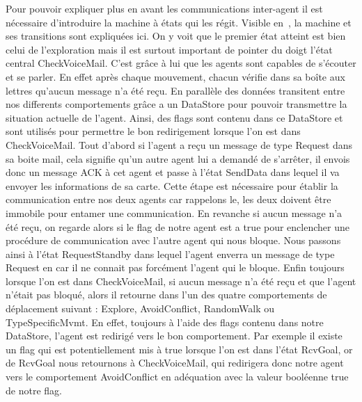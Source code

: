 \documentclass[11pt]{article}
\begin{document}
Pour pouvoir expliquer plus en avant les communications inter-agent il est nécessaire d'introduire la machine à états qui les régit. Visible en~, la machine et ses transitions sont expliquées ici. On y voit que le premier état atteint est bien celui de l'exploration mais il est surtout important de pointer du doigt l'état central \textsf{CheckVoiceMail}. C'est grâce à lui que les agents sont capables de s'écouter et se parler. En effet après chaque mouvement, chacun vérifie dans sa boîte aux lettres qu'aucun message n'a été reçu. En parallèle des données transitent entre nos differents comportements grâce a un DataStore pour pouvoir transmettre la situation actuelle de l'agent. Ainsi, des flags sont contenu dans ce DataStore et sont utilisés pour permettre le bon redirigement lorsque l'on est dans \textsf{CheckVoiceMail}. Tout d'abord si l'agent a reçu un message de type Request dans sa boite mail, cela signifie qu'un autre agent lui a demandé de s'arrêter, il envois donc un message ACK à cet agent et passe à l'état \textsf{SendData} dans lequel il va envoyer les informations de sa carte. Cette étape est nécessaire pour établir la communication entre nos deux agents car rappelons le, les deux doivent être immobile pour entamer une communication. En revanche si aucun message n'a été reçu, on regarde alors si le flag  de notre agent est a true pour enclencher une procédure de communication avec l'autre agent qui nous bloque. Nous passons ainsi à l'état \textsf{RequestStandby} dans lequel l'agent enverra un message de type Request en  car il ne connait pas forcément l'agent qui le bloque. Enfin toujours lorsque l'on est dans \textsf{CheckVoiceMail}, si aucun message n'a été reçu et que l'agent n'était pas bloqué, alors il retourne dans l'un  des quatre comportements de déplacement suivant : \textsf{Explore}, \textsf{AvoidConflict}, \textsf{RandomWalk} ou \textsf{TypeSpecificMvmt}. En effet, toujours à l'aide des flags contenu dans notre DataStore, l'agent est redirigé vers le bon comportement. Par exemple il existe un flag  qui est potentiellement mis à true lorsque l'on est dans l'état \textsf{RcvGoal}, or de \textsf{RcvGoal} nous retournons à \textsf{CheckVoiceMail}, qui redirigera donc notre agent vers le comportement \textsf{AvoidConflict} en adéquation avec la valeur booléenne true de notre flag.
\end{document}
